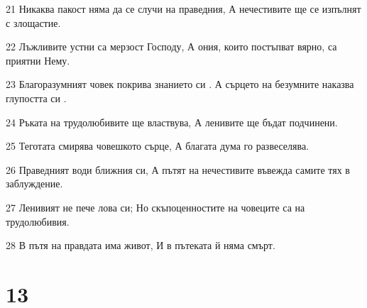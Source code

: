 \par 21 Никаква пакост няма да се случи на праведния, А нечестивите ще се изпълнят с злощастие.
\par 22 Лъжливите устни са мерзост Господу, А ония, които постъпват вярно, са приятни Нему.
\par 23 Благоразумният човек покрива знанието си . А сърцето на безумните наказва глупостта си .
\par 24 Ръката на трудолюбивите ще властвува, А ленивите ще бъдат подчинени.
\par 25 Теготата смирява човешкото сърце, А благата дума го развеселява.
\par 26 Праведният води ближния си, А пътят на нечестивите въвежда самите тях в заблуждение.
\par 27 Ленивият не пече лова си; Но скъпоценностите на човеците са на трудолюбивия.
\par 28 В пътя на правдата има живот, И в пътеката й няма смърт.

\chapter{13}

